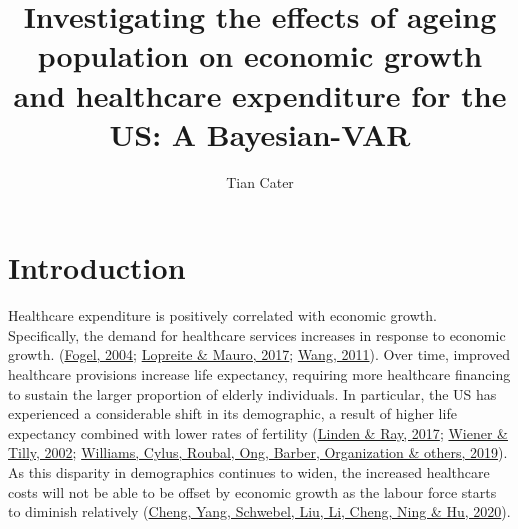 \documentclass[11pt,preprint, authoryear]{elsarticle}
\numberwithin{equation}{section}
\numberwithin{figure}{section}
\numberwithin{table}{section}
\begin{document}
\begin{frontmatter}  %

\title{Investigating the effects of ageing population on economic growth
and healthcare expenditure for the US: A Bayesian-VAR}





\author[Add1]{Tian Cater}





\address[Add1]{Advanced Time Series Econometrics 872 Project}
\address[Add2]{15 January 2023}



\vspace{1cm}





\vspace{0.5cm}

\end{frontmatter}



\pagestyle{fancy}
\chead{}
\rhead{}
\lfoot{}
\lhead{}
\cfoot{}


\headsep 35pt %




\hypertarget{introduction}{%
\section{\texorpdfstring{Introduction
\label{Introduction}}{Introduction }}\label{introduction}}

Healthcare expenditure is positively correlated with economic growth.
Specifically, the demand for healthcare services increases in response
to economic growth. (\protect\hyperlink{ref-fogel2004}{Fogel, 2004};
\protect\hyperlink{ref-lopreite2017}{Lopreite \& Mauro, 2017};
\protect\hyperlink{ref-wang2011}{Wang, 2011}). Over time, improved
healthcare provisions increase life expectancy, requiring more
healthcare financing to sustain the larger proportion of elderly
individuals. In particular, the US has experienced a considerable shift
in its demographic, a result of higher life expectancy combined with
lower rates of fertility (\protect\hyperlink{ref-linden2017}{Linden \&
Ray, 2017}; \protect\hyperlink{ref-wiener2002}{Wiener \& Tilly, 2002};
\protect\hyperlink{ref-williams2019}{Williams, Cylus, Roubal, Ong,
Barber, Organization \& others, 2019}). As this disparity in
demographics continues to widen, the increased healthcare costs will not
be able to be offset by economic growth as the labour force starts to
diminish relatively (\protect\hyperlink{ref-cheng2020}{Cheng, Yang,
Schwebel, Liu, Li, Cheng, Ning \& Hu, 2020}).
\end{document}
